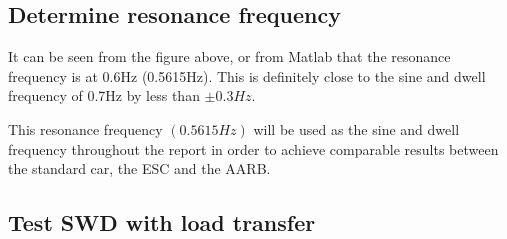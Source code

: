 \subsection{Determine resonance frequency}
It can be seen from the figure above, or from Matlab that the resonance frequency is at 0.6Hz (0.5615Hz). This is definitely close to the sine and dwell frequency of 0.7Hz by less than $\pm 0.3 Hz$.

This resonance frequency $(0.5615 Hz)$ will be used as the sine and dwell frequency throughout the report in order to achieve comparable results between the standard car, the ESC and the AARB.

\subsection{Test SWD with load transfer}
